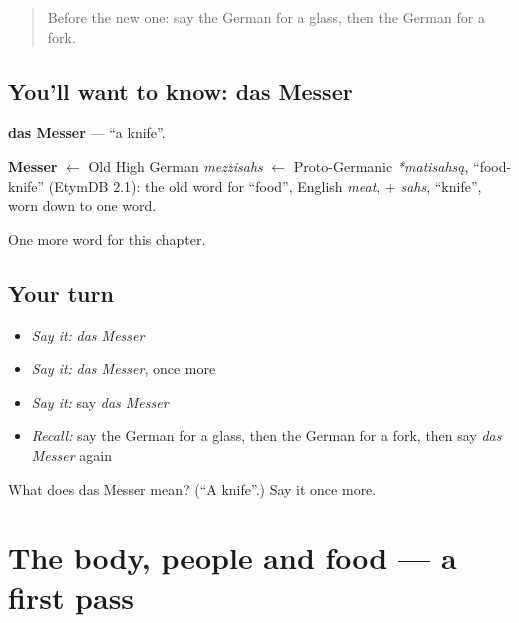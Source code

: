 \label{lesson:GE-C79-messer}



\begin{quote}
Before the new one: say the German for a glass, then the German for a fork.
\end{quote}

\subsection*{You'll want to know: das Messer}
\textbf{das Messer} — \textquotedblleft{}a knife\textquotedblright{}.

\begin{cousinweb}
\textbf{Messer} $\leftarrow$ Old High German \emph{mezzisahs} $\leftarrow$ Proto-Germanic \emph{*matisahsą}, \textquotedblleft{}food-knife\textquotedblright{} (EtymDB 2.1): the old word for \textquotedblleft{}food\textquotedblright{}, English \emph{meat}, + \emph{sahs}, \textquotedblleft{}knife\textquotedblright{}, worn down to one word.
\end{cousinweb}

\begin{grammarlens}[title={What you've built}]
One more word for this chapter.
\end{grammarlens}

\subsection*{Your turn}
\begin{itemize}
\raggedright
  \item \emph{Say it:} \emph{das Messer}
  \item \emph{Say it:} \emph{das Messer}, once more
  \item \emph{Say it:} say \emph{das Messer}
  \item \emph{Recall:} say the German for a glass, then the German for a fork, then say \emph{das Messer} again
\end{itemize}

\begin{tcolorbox}[breakable,colback=teal!4,colframe=teal!35!black,title={Before you move on}]
What does das Messer mean? (\textquotedblleft{}A knife\textquotedblright{}.) Say it once more.
\end{tcolorbox}
\section[(dialogue)]{The body, people and food — a first pass}

